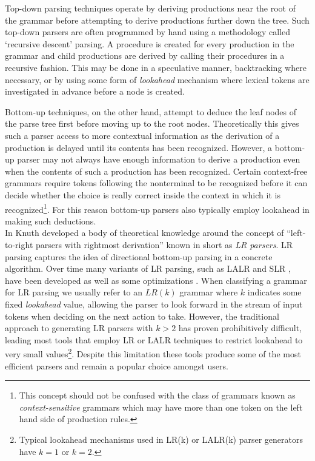 \documentclass[a4paper,11pt]{article}
\begin{document}
Top-down parsing techniques operate by deriving productions near the root of the grammar before attempting to derive productions further down the tree.
Such top-down parsers are often programmed by hand using a methodology called `recursive descent' parsing.
A procedure is created for every production in the grammar and child productions are derived by calling their procedures in a recursive fashion.
This may be done in a speculative manner, backtracking where necessary, or by using some form of \emph{lookahead} mechanism where lexical tokens are investigated in advance before a node is created.

Bottom-up techniques, on the other hand, attempt to deduce the leaf nodes of the parse tree first before moving up to the root nodes. 
Theoretically this gives such a parser access to more contextual information %
as the derivation of a production is delayed until its contents has been recognized.
However, a bottom-up parser may not always have enough information to derive a production even when the contents of such a production has been recognized. 
Certain context-free grammars require tokens following the nonterminal to be recognized before it can decide whether the choice is really correct inside the context in which it is recognized\footnote{This concept should not be confused with the class of grammars known as \emph{context-sensitive} grammars which may have more than one token on the left hand side of production rules.}.
For this reason bottom-up parsers also typically employ lookahead in making such deductions.\\

In \cite{knuth65} Knuth developed a body of theoretical knowledge around the concept of ``left-to-right parsers with rightmost derivation'' known in short as \emph{LR parsers}. 
LR parsing captures the idea of directional bottom-up parsing in a concrete algorithm.
Over time many variants of LR parsing, such as LALR and SLR \cite{362625}, have been developed as well as some optimizations \cite{13326}.
When classifying a grammar for LR parsing we usually refer to an $LR(k)$ grammar where $k$ indicates some fixed \emph{lookahead} value, allowing the parser to look forward in the stream of input tokens when deciding on the next action to take.
However, the traditional approach to generating LR parsers with $k > 2$ has proven prohibitively difficult, leading most tools that employ LR or LALR techniques to restrict lookahead to very small values\footnote{Typical lookahead mechanisms used in LR(k) or LALR(k) parser generators have $k = 1$ or $k = 2$.}.
Despite this limitation these tools produce some of the most efficient parsers and remain a popular choice amongst users.
\end{document}
